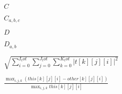 \documentclass{article}
\begin{document}
$C$
\pagebreak

$C_{a,b,c}$
\pagebreak

$D$
\pagebreak

$D_{a,b}$
\pagebreak

$\sqrt{ \sum_{i=0}^{I_tot}\sum_{j=0}^{J_tot}\sum_{k=0}^{K_tot} |t[k][j][i]|^2 }$
\pagebreak

$ \frac{ \max_{i,j,k}(this[k][j][i] - other[k][j][i]) }{ \max_{i,j,k}this[k][j][i] } $
\pagebreak
\end{document}
